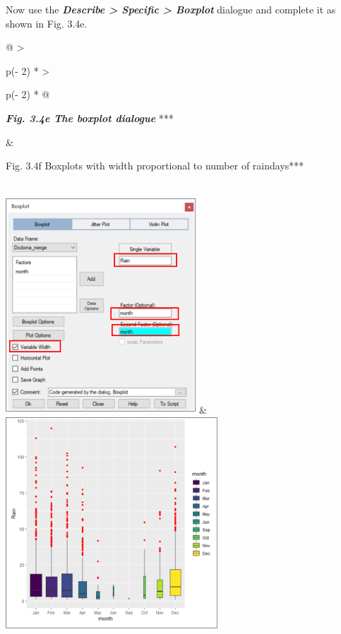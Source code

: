 \documentclass[
  letterpaper,
  DIV=11,
  numbers=noendperiod]{scrreprt}
\begin{document}
Now use the \textbf{\emph{Describe \textgreater{} Specific
\textgreater{} Boxplot}} dialogue and complete it as shown in Fig. 3.4e.

\begin{longtable}[]{@{}
  >{\raggedright\arraybackslash}p{(\columnwidth - 2\tabcolsep) * }
  >{\raggedright\arraybackslash}p{(\columnwidth - 2\tabcolsep) * }@{}}
\toprule\noalign{}
\begin{minipage}[b]{\linewidth}\raggedright
\textbf{\emph{Fig. 3.4e The boxplot dialogue}} ***
\end{minipage} & \begin{minipage}[b]{\linewidth}\raggedright
Fig. 3.4f Boxplots with width proportional to number of raindays***
\end{minipage} \\
\midrule\noalign{}
\endhead
\bottomrule\noalign{}
\endlastfoot
\includegraphics[width=2.80512in,height=3.20375in]{figures/Fig3.4e.png}
& \includegraphics[width=3.125in,height=3.125in]{figures/Fig3.4f.png} \\
\end{longtable}
\end{document}
